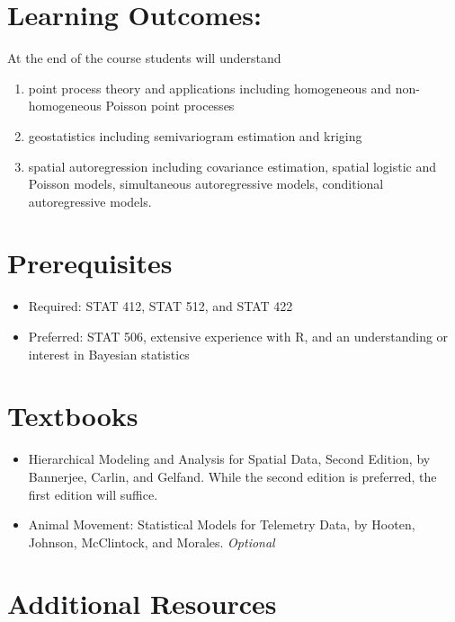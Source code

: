 \documentclass[11pt,]{article}
\providecommand{\tightlist}{%
  \setlength{\itemsep}{0pt}\setlength{\parskip}{0pt}}
\begin{document}
\hypertarget{learning-outcomes}{%
\section{Learning Outcomes:}\label{learning-outcomes}}

At the end of the course students will understand

\begin{enumerate}
\def\labelenumi{\arabic{enumi}.}
\item
  point process theory and applications including homogeneous and
  non-homogeneous Poisson point processes
\item
  geostatistics including semivariogram estimation and kriging
\item
  spatial autoregression including covariance estimation, spatial
  logistic and Poisson models, simultaneous autoregressive models,
  conditional autoregressive models.
\end{enumerate}

\hypertarget{prerequisites}{%
\section{Prerequisites}\label{prerequisites}}

\begin{itemize}
\tightlist
\item
  Required: STAT 412, STAT 512, and STAT 422
\item
  Preferred: STAT 506, extensive experience with R, and an understanding
  or interest in Bayesian statistics
\end{itemize}

\hypertarget{textbooks}{%
\section{Textbooks}\label{textbooks}}

\begin{itemize}
\tightlist
\item
  Hierarchical Modeling and Analysis for Spatial Data, Second Edition,
  by Bannerjee, Carlin, and Gelfand. While the second edition is
  preferred, the first edition will suffice.
\item
  Animal Movement: Statistical Models for Telemetry Data, by Hooten,
  Johnson, McClintock, and Morales. \emph{Optional}
\end{itemize}

\hypertarget{additional-resources}{%
\section{Additional Resources}\label{additional-resources}}
\end{document}
